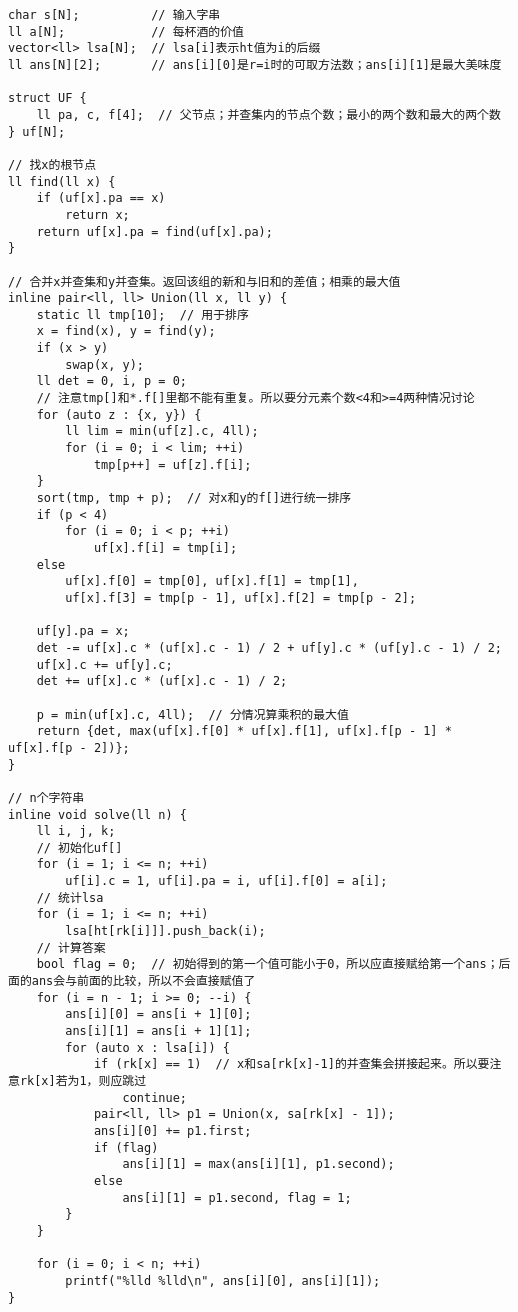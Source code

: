 \begin{lstlisting}
char s[N];          // 输入字串
ll a[N];            // 每杯酒的价值
vector<ll> lsa[N];  // lsa[i]表示ht值为i的后缀
ll ans[N][2];       // ans[i][0]是r=i时的可取方法数；ans[i][1]是最大美味度

struct UF {
    ll pa, c, f[4];  // 父节点；并查集内的节点个数；最小的两个数和最大的两个数
} uf[N];

// 找x的根节点
ll find(ll x) {
    if (uf[x].pa == x)
        return x;
    return uf[x].pa = find(uf[x].pa);
}

// 合并x并查集和y并查集。返回该组的新和与旧和的差值；相乘的最大值
inline pair<ll, ll> Union(ll x, ll y) {
    static ll tmp[10];  // 用于排序
    x = find(x), y = find(y);
    if (x > y)
        swap(x, y);
    ll det = 0, i, p = 0;
    // 注意tmp[]和*.f[]里都不能有重复。所以要分元素个数<4和>=4两种情况讨论
    for (auto z : {x, y}) {
        ll lim = min(uf[z].c, 4ll);
        for (i = 0; i < lim; ++i)
            tmp[p++] = uf[z].f[i];
    }
    sort(tmp, tmp + p);  // 对x和y的f[]进行统一排序
    if (p < 4)
        for (i = 0; i < p; ++i)
            uf[x].f[i] = tmp[i];
    else
        uf[x].f[0] = tmp[0], uf[x].f[1] = tmp[1],
        uf[x].f[3] = tmp[p - 1], uf[x].f[2] = tmp[p - 2];

    uf[y].pa = x;
    det -= uf[x].c * (uf[x].c - 1) / 2 + uf[y].c * (uf[y].c - 1) / 2;
    uf[x].c += uf[y].c;
    det += uf[x].c * (uf[x].c - 1) / 2;

    p = min(uf[x].c, 4ll);  // 分情况算乘积的最大值
    return {det, max(uf[x].f[0] * uf[x].f[1], uf[x].f[p - 1] * uf[x].f[p - 2])};
}

// n个字符串
inline void solve(ll n) {
    ll i, j, k;
    // 初始化uf[]
    for (i = 1; i <= n; ++i)
        uf[i].c = 1, uf[i].pa = i, uf[i].f[0] = a[i];
    // 统计lsa
    for (i = 1; i <= n; ++i)
        lsa[ht[rk[i]]].push_back(i);
    // 计算答案
    bool flag = 0;  // 初始得到的第一个值可能小于0，所以应直接赋给第一个ans；后面的ans会与前面的比较，所以不会直接赋值了
    for (i = n - 1; i >= 0; --i) {
        ans[i][0] = ans[i + 1][0];
        ans[i][1] = ans[i + 1][1];
        for (auto x : lsa[i]) {
            if (rk[x] == 1)  // x和sa[rk[x]-1]的并查集会拼接起来。所以要注意rk[x]若为1，则应跳过
                continue;
            pair<ll, ll> p1 = Union(x, sa[rk[x] - 1]);
            ans[i][0] += p1.first;
            if (flag)
                ans[i][1] = max(ans[i][1], p1.second);
            else
                ans[i][1] = p1.second, flag = 1;
        }
    }

    for (i = 0; i < n; ++i)
        printf("%lld %lld\n", ans[i][0], ans[i][1]);
}
\end{lstlisting}